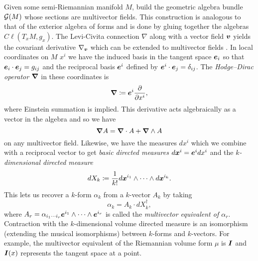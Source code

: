 \documentclass{article}
\begin{document}
Given some semi-Riemannian manifold $M$, build the geometric algebra bundle $\mathcal{G}(M)$ whose sections are multivector fields. This construction is analogous to that of the exterior algebra of forms and is done by gluing together the algebras $C\ell(T_xM,g_x)$.  The Levi-Civita connection $\nabla$ along with a vector field $\boldsymbol{v}$ yields the covariant derivative $\nabla_{\boldsymbol{v}}$ which can be extended to multivector fields \cite{schindler_geometric_2020}. In local coordinates on $M$ $x^i$ we have the induced basis in the tangent space $\boldsymbol{e}_i$ so that $\boldsymbol{e}_i\cdot \boldsymbol{e}_j = g_{ij}$ and the reciprocal basis $\boldsymbol{e}^i$ defined by $\boldsymbol{e}^i\cdot \boldsymbol{e}_j = \delta_{ij}$. The \emph{Hodge--Dirac operator} $\boldsymbol{\nabla}$ in these coordinates is
\begin{equation}
    \boldsymbol{\nabla} \coloneqq \boldsymbol{e}^i \frac{\partial}{\partial x^i},
\end{equation}
where Einstein summation is implied. This derivative acts algebraically as a vector in the algebra and so we have
\begin{equation}
\boldsymbol{\nabla} A = \boldsymbol{\nabla} \cdot A + \boldsymbol{\nabla} \wedge A
\end{equation}
on any multivector field. Likewise, we have the measures $dx^i$ which we combine with a reciprocal vector to get \emph{basic directed measures} $d\boldsymbol{x}^i = \boldsymbol{e}^i dx^i$ and the \emph{$k$-dimensional directed measure}
\begin{equation}
    dX_k \coloneqq \frac{1}{k!} d\boldsymbol{x}^{i_1}\wedge \cdots \wedge d\boldsymbol{x}^{i_k}.
\end{equation}
This lets us recover a $k$-form $\alpha_k$ from a $k$-vector $A_k$ by taking
\begin{equation}
\alpha_k = A_k \cdot dX_k^\dagger,
\end{equation}
where $A_r = \alpha_{i_1 \cdots i_r} \boldsymbol{e}^{i_1} \wedge \cdots \wedge \boldsymbol{e}^{i_r}$ is called the \emph{multivector equivalent of $\alpha_r$}. Contraction with the $k$-dimensional volume directed measure is an isomorphism (extending the musical isomorphisms) between $k$-forms and $k$-vectors. For example, the multivector equivalent of the Riemannian volume form $\mu$ is $\boldsymbol{I}$ and $\boldsymbol{I}(x)$ represents the tangent space at a point. 
\end{document}
